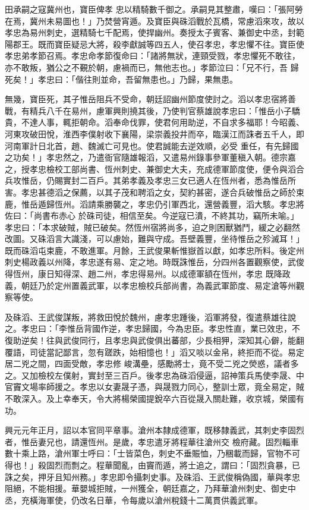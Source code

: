 \begin{pinyinscope}
 田承嗣之寇冀州也，寶臣俾孝
 忠以精騎數千御之。承嗣見其整肅，嘆曰：「張阿勞在焉，冀州未易圖也！」乃焚營宵遁。及寶臣與硃滔戰於瓦橋，常慮滔來攻，故以孝忠為易州刺史，選精騎七千配焉，使捍幽州。奏授太子賓客、兼御史中丞，封範陽郡王。既而寶臣疑忌大將，殺李獻誠等四五人，使召孝忠，孝忠懼不往。寶臣使孝忠弟孝節召焉。孝忠命孝節復命曰：「諸將無狀，連頸受戮，孝忠懼死不敢往，亦不敢叛，猶公之不覲於朝，慮禍而已，無他志也。」孝節泣曰：「兄不行，吾
 歸死矣！」孝忠曰：「偕往則並命，吾留無患也。」乃歸，果無患。



 無幾，寶臣死，其子惟岳阻兵不受命，朝廷詔幽州節度使討之。滔以孝忠宿將善戰，有精兵八千在易州，慮軍興則撓其後，乃使判官蔡雄說孝忠曰：「惟岳小子驕貴，不達人事，輒拒朝命。滔奉命伐罪，使君何用助逆，不自求多福耶！今昭義、河東攻破田悅，淮西李僕射收下襄陽，梁崇義投井而卒，臨漢江而誅者五千人，即河南軍計日北首，趙、魏滅亡可見也。使君誠能去逆效順，必受
 重任，有先歸國之功矣！」孝忠然之，乃遣衙官隨雄報滔，又遣易州錄事參軍董稹入朝。德宗嘉之，授孝忠檢校工部尚書、恆州刺史、兼御史大夫，充成德軍節度使，便令與滔合兵攻惟岳，仍賜實封二百戶。其弟孝義及孝忠三女已適人在恆州者，悉為惟岳所害。孝忠甚德滔之保薦，以其子茂和聘滔之女，契約甚密，遂合兵破惟岳之師於束鹿，惟岳遁歸恆州。滔請乘勝襲之，孝忠仍引軍西北，還營義豐，滔大駭。孝忠將佐曰：「尚書布赤心
 於硃司徒，相信至矣。今逆寇已潰，不終其功，竊所未喻。」孝忠曰：「本求破賊，賊已破矣。然恆州宿將尚多，迫之則困獸猶鬥，緩之必翻然改圖。又硃滔言大識淺，可以慮始，難與守成。吾壁義豐，坐待惟岳之殄滅耳！」既而硃滔屯束鹿，不敢進軍。月餘，王武俊果斬惟嶽首以獻，如孝忠所料。後定州刺史楊政義以州降，孝忠遂有易、定之地。時既誅惟岳，分四州各置觀察使，武俊得恆州，康日知得深、趙二州，孝忠得易州。以成德軍額在恆州，孝忠
 既降政義，朝廷乃於定州置義武軍，以孝忠檢校兵部尚書，為義武軍節度、易定滄等州觀察等使。



 及硃滔、王武俊謀叛，將救田悅於魏州，慮孝忠踵後，滔軍將發，復遣蔡雄往說之。孝忠曰：「李惟岳背國作逆，孝忠歸國，今為忠臣。孝忠性直，業已效忠，不復助逆矣！往與武俊同行，且孝忠與武俊俱出蕃部，少長相狎，深知其心僻，能翻覆語，司徒當記鄙言，忽有蹉跌，始相憶也！」滔又啖以金帛，終拒而不從。易定居二兇之間，四面受敵，孝忠修
 峻溝壘，感勵將士，竟不受二兇之熒惑，議者多之。又加檢校左僕射，實封至三百戶。後孝忠為硃滔侵逼，詔神策兵馬使李晟、中官竇文場率師援之。孝忠以女妻晟子憑，與晟戮力同心，整訓士眾，竟全易定，賊不敢深入。及上幸奉天，令大將楊榮國提銳卒六百從晟入關赴難，收京城，榮國有功。



 興元元年正月，詔以本官同平章事。滄州本隸成德軍，既移隸義武，其刺史李固烈者，惟岳妻兄也，請還恆州。是歲，孝忠遣牙將程華往滄州交
 檢府藏。固烈輜車數十乘上路，滄州軍士呼曰：「士皆菜色，刺史不垂賑恤，乃稇載而歸，官物不可得也！」殺固烈而剽之。程華聞亂，由竇而遁，將士追之，謂曰：「固烈貪暴，已誅之矣，押牙且知州務。」孝忠即令攝刺史事。及硃滔、王武俊稱偽國，華與孝忠阻絕，不能相援。華嬰城拒賊，一州獲全，朝廷嘉之，乃拜華滄州刺史、御史中丞，充橫海軍使，仍改名日華，令每歲以滄州稅錢十二萬貫供義武軍。




\end{pinyinscope}
